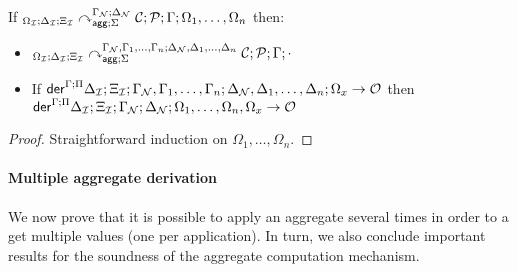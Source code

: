 \begin{theorem}\label{thm:aggregate_derivation}
If ${{}_{\Omega_{\mathcal{I}} ; \Delta_{\mathcal{I}} ; \Xi_{\mathcal{I}}}\curvearrowright}_{\mathsf{agg} ; \Sigma}^{\Gamma_{\mathcal{N}}; \Delta_{\mathcal{N}}} \; \mathcal{C}; \mathcal{P} ; \Gamma ; \Omega_1,
\dotsc, \Omega_n$ then:

\begin{itemize}[leftmargin=*]
   \item ${{}_{\Omega_{\mathcal{I}} ; \Delta_{\mathcal{I}} ; \Xi_{\mathcal{I}}}\curvearrowright}_{\mathsf{agg} ; \Sigma}^{\Gamma_{\mathcal{N}}, \Gamma_1, \dotsc,
      \Gamma_n; \Delta_{\mathcal{N}}, \Delta_1, \dotsc, \Delta_n} \; \mathcal{C};
         \mathcal{P} ; \Gamma ; \cdot$

   \item If $\mathsf{der}^{\Gamma ; \Pi} \Delta_{\mathcal{I}} ; \Xi_{\mathcal{I}}; \Gamma_{\mathcal{N}}, \Gamma_1, \dotsc,
         \Gamma_n; \Delta_{\mathcal{N}}, \Delta_1, \dotsc, \Delta_n; \Omega_x \rightarrow \mathcal{O}$ then\\
         \hspace{2cm}
   $\mathsf{der}^{\Gamma ; \Pi} \Delta_{\mathcal{I}} ; \Xi_{\mathcal{I}}; \Gamma_{\mathcal{N}}; \Delta_{\mathcal{N}}; \Omega_1, \dotsc,
   \Omega_n, \Omega_x \rightarrow \mathcal{O}$

\end{itemize}
\end{theorem}

\begin{proof}
Straightforward induction on $\Omega_1, \dotsc, \Omega_n$.
\end{proof}


\paragraph{Multiple aggregate derivation} We now prove that it is possible
to apply an aggregate several times in order to a get multiple values (one per
application). In turn, we also conclude important results for the
soundness of the aggregate computation mechanism.

